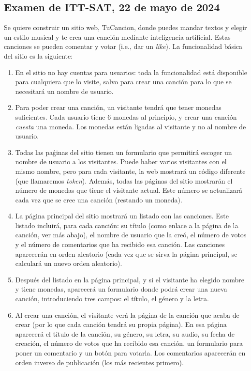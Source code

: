 
\subsection{Examen de ITT-SAT, 22 de mayo de 2024}

Se quiere construir un sitio web, TuCancion, donde puedes mandar textos y elegir un estilo musical y te crea una canción mediante inteligencia artificial. Estas canciones se pueden comentar y votar (i.e., dar un \emph{like}). La funcionalidad básica del sitio es la siguiente:

\begin{enumerate}
  \item En el sitio no hay cuentas para usuarios: toda la funcionalidad está disponible para cualquiera que lo visite, salvo para crear una canción para lo que se necesitará un nombre de usuario.
  \item Para poder crear una canción, un visitante tendrá que tener monedas suficientes. Cada usuario tiene 6 monedas al principio, y crear una canción \emph{cuesta} una moneda. Los monedas están ligadas al visitante y no al nombre de usuario.
  \item Todas las paǵinas del sitio tienen un formulario que permitirá escoger un nombre de usuario a los visitantes. Puede haber varios visitantes con el mismo nombre, pero para cada visitante, la web mostrará un código diferente (que llamaremos \emph{token}). Además, todas las páginas del sitio mostrarán el número de monedas que tiene el visitante actual. Este número se actualizará cada vez que se cree una canción (restando un moneda).
  \item La página principal del sitio mostrará un listado con las canciones. Este listado incluirá, para cada canción: su título (como enlace a la página de la canción, ver más abajo), el nombre de usuario que la creó, el número de votos y el número de comentarios que ha recibido esa canción. Las canciones aparecerán en orden aleatorio (cada vez que se sirva la página principal, se calculará un nuevo orden aleatorio). 
  \item Después del listado en la página principal, y si el visitante ha elegido nombre y tiene monedas, aparecerá un formulario donde podrá crear una nueva canción, introduciendo tres campos: el título, el género y la letra.
  \item Al crear una canción, el visitante verá la página de la canción que acaba de crear (por lo que cada canción tendrá su propia página). En esa página aparecerá el título de la canción, su género, su letra, su audio, su fecha de creación, el número de votos que ha recibido esa canción, un formulario para poner un comentario y un botón para votarla. Los comentarios aparecerán en orden inverso de publicación (los más recientes primero).

\end{enumerate}
